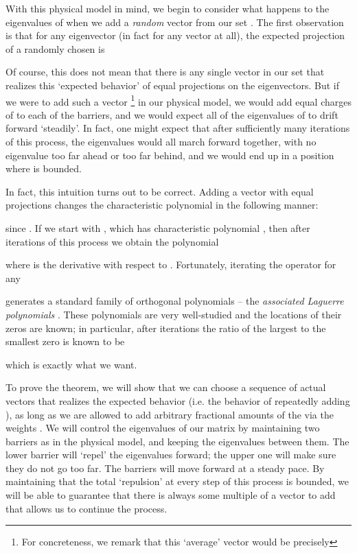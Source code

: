 \documentclass[12pt]{article}
\begin{document}
With this physical model in mind, we begin to consider what happens to the
  eigenvalues of  when we add a {\em random} vector from our set .
The first observation is that for any eigenvector  (in fact for any vector
  at all), the expected projection of a randomly chosen 
  is 

Of course, this does not mean that there is any single vector  in
  our set that realizes this `expected behavior' of equal projections on the
  eigenvectors.
But if we were to add such a vector
\footnote{For concreteness, we remark that this `average' vector would be
  precisely
}
 in our physical model, we would add equal 
  charges of  to each of the barriers, and we would expect all of the
  eigenvalues of  to drift forward `steadily'.
In fact, one might expect that after sufficiently many iterations of this
  process, the eigenvalues would all march forward together, with no eigenvalue
  too far ahead or too far behind, and we would 
  end up in a position where  is bounded.

In fact, this intuition turns out to be correct. 
Adding a vector with equal projections changes the characteristic polynomial 
  in the following manner:

since . 
If we start with , which has characteristic polynomial ,  
  then after  iterations of this process we obtain the polynomial
  
where  is the derivative with respect to .
Fortunately, iterating the operator  for any

  generates a standard family of orthogonal polynomials -- the {\em associated
  Laguerre polynomials} \cite{dette}. 
These polynomials are very well-studied and the locations of their zeros are
  known; in particular, after  iterations the ratio of the largest to the
  smallest zero is known \cite{dette} to be
  
  which is exactly what we want.

To prove the theorem, we will show that we can choose a sequence of actual vectors
  that realizes the expected behavior (i.e. the behavior of repeatedly adding ),
  as long as we are allowed to add 
  arbitrary fractional amounts of the  via the weights .
We will control the eigenvalues of our matrix by maintaining two barriers as 
  in the physical model, and keeping the eigenvalues between them. 
The lower barrier will `repel' the eigenvalues forward; the upper one will make sure
  they do not go too far. 
The barriers will move forward at a steady pace.
By maintaining that the total `repulsion' at every step of this process is
  bounded, we will be able to guarantee that there is always some multiple of 
  a vector to add that allows us to continue the process.
\end{document}
